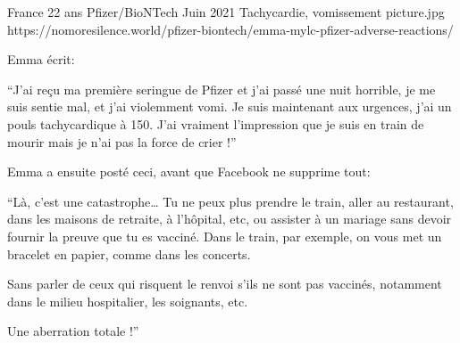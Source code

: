 {France}
{22 ans}
{Pfizer/BioNTech}
{Juin 2021}
{Tachycardie, vomissement}
{picture.jpg}
{https://nomoresilence.world/pfizer-biontech/emma-mylc-pfizer-adverse-reactions/}
{

Emma écrit:

“J'ai reçu ma première seringue de Pfizer et j'ai passé une nuit horrible, je me
suis sentie mal, et j'ai violemment vomi. Je suis maintenant aux urgences, j'ai
un pouls tachycardique à 150. J'ai vraiment l'impression que je suis en train de
mourir mais je n'ai pas la force de crier !”

Emma a ensuite posté ceci, avant que Facebook ne supprime tout:

“Là, c'est une catastrophe… Tu ne peux plus prendre le train, aller au
restaurant, dans les maisons de retraite, à l'hôpital, etc, ou assister à un
mariage sans devoir fournir la preuve que tu es vacciné. Dans le train, par
exemple, on vous met un bracelet en papier, comme dans les concerts.

Sans parler de ceux qui risquent le renvoi s'ils ne sont pas vaccinés, notamment
dans le milieu hospitalier, les soignants, etc.

Une aberration totale !”

}
